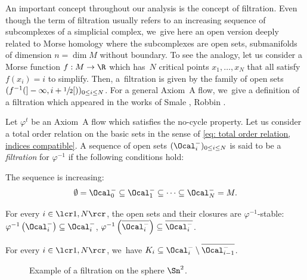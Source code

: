 
An important concept throughout our analysis is the concept of filtration. Even though the term of filtration usually refers to an increasing sequence of subcomplexes of a simplicial complex, we~give here an open version deeply related to Morse homology where the subcomplexes are open sets, \ie submanifolds of dimension $n = \dim M$ without boundary. To see the analogy, let us consider a Morse function $f: M \to \R$ which has~$N$ critical points $x_1,\dots, x_N$ that all satisfy $f(x_i) = i$ to simplify. Then, a~filtration is given by the family of open sets $(f^{-1} (]-\infty,i +\sfrac{1}{2}[))_{0 \leq i \leq N}$. For a general Axiom~A flow, we~give a definition of a filtration which appeared in the works of Smale \cite{smale}, Robbin \cite[Lem.\,7.9, p.\,471]{robbin}.

\begin{definition}[Filtration]\label{Def: filtration} Let $\varphi^t$ be an Axiom~A flow which satisfies the no-cycle property. Let us consider a total order relation on the basic sets in the sense of \eqref{eq: total order relation, indices compatible}. A sequence of open sets $(\Ocal_i^-)_{0 \leq i \leq N}$ is said to be a \emph{filtration} for $\varphi^{-1}$ if the following conditions hold:
\begin{enumeratei}
\item The sequence is increasing:
\[
\emptyset = \Ocal_0^- \subseteq \Ocal_{1}^- \subseteq \cdots \subseteq \Ocal_N^- = M.
\]
\item For every $i\in\lcr1,N\rcr$, the open sets and their closures are $\varphi^{-1}$-stable: $\varphi^{-1} \left(\Ocal_{i}^- \right) \subseteq \Ocal_{i}^- $, $\varphi^{-1} \left(\overline{\Ocal_{i}^-} \right) \subseteq \overline{\Ocal_{i}^-}$.
\item For every $i\in\lcr1,N\rcr$, we~have $K_i \subseteq \Ocal_i^- \setminus \overline{\Ocal_{i-1}^-}$.
\end{enumeratei}
\end{definition}

\begin{figure}[t]
\centering
\def\svgscale{0.6}

\caption{Example of a filtration on the sphere $\Sn^2$.}
\label{fig: filtration on the sphere}
\end{figure}

